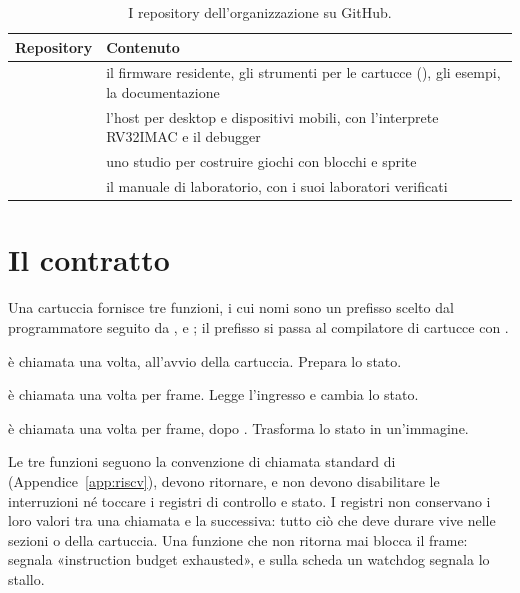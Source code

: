 \begin{table}[htb]
\centering\small
\caption{I repository dell'organizzazione  su GitHub.}\label{tab:prg:repos}
\begin{tabularx}{\textwidth}{@{}P{0.42\textwidth}L@{}}
\toprule
\textbf{Repository} & \textbf{Contenuto}\\
\midrule
{} & il firmware residente, gli strumenti per le cartucce (), gli esempi, la documentazione\\
 & l'host per desktop e dispositivi mobili, con l'interprete RV32IMAC e il debugger\\
 & uno studio per costruire giochi con blocchi e sprite\\
 & il manuale di laboratorio, con i suoi laboratori verificati\\
\bottomrule
\end{tabularx}
\end{table}

\section{Il contratto}

Una cartuccia fornisce tre funzioni, i cui nomi sono un prefisso scelto dal
programmatore seguito da ,  e ; il
prefisso si passa al compilatore di cartucce con .

\begin{description}[style=nextline,leftmargin=1.5em]
\item[\code{prefix\_init}] è chiamata una volta, all'avvio della cartuccia.
  Prepara lo stato.
\item[\code{prefix\_update}] è chiamata una volta per frame. Legge l'ingresso
  e cambia lo stato.
\item[\code{prefix\_draw}] è chiamata una volta per frame, dopo .
  Trasforma lo stato in un'immagine.
\end{description}

Le tre funzioni seguono la convenzione di chiamata standard di \riscv
(Appendice~\ref{app:riscv}), devono ritornare, e non devono disabilitare le
interruzioni né toccare i registri di controllo e stato. I registri non
conservano i loro valori tra una chiamata e la successiva: tutto ciò che deve
durare vive nelle sezioni  o  della cartuccia. Una
funzione che non ritorna mai blocca il frame: \prgqt segnala «instruction
budget exhausted», e sulla scheda un watchdog segnala lo stallo.

